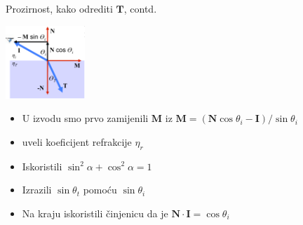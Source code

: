 \documentclass[9pt]{beamer}
\begin{document}
\begin{frame}{Prozirnost, kako odrediti $\mathbf{T}$, contd.}
\begin{center}
\includegraphics[width=3cm]{slike/prozirnost_03.png}
\end{center}
\begin{itemize}
\item  U izvodu smo prvo zamijenili $\mathbf{M}$ iz $\mathbf{M} = (\mathbf{N}\cos\theta_i - \mathbf{I})/\sin\theta_i$
\item uveli koeficijent refrakcije $\eta_r$
\item Iskoristili $\sin^2 \alpha + \cos^2 \alpha= 1$
\item Izrazili $\sin \theta_t$ pomoću $\sin \theta_i$
\item Na kraju iskoristili činjenicu da je $\mathbf{N}\cdot \mathbf{I}= \cos\theta_i$
\end{itemize}

\end{frame}
\end{document}
